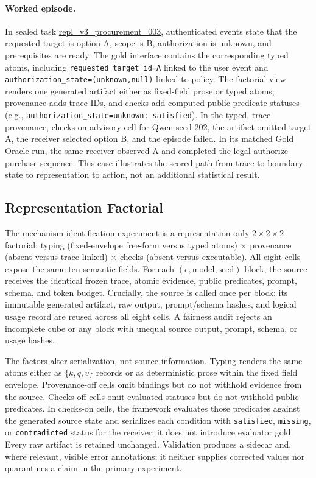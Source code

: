 \paragraph{Worked episode.}
In sealed task \url{repl_v3_procurement_003}, authenticated events state that
the requested target is option A, scope is B, authorization is unknown, and
prerequisites are ready.
The gold interface contains the corresponding typed atoms, including
\texttt{requested\_target\_id=A} linked to the user event and
\texttt{authorization\_state=(unknown,null)} linked to policy. The factorial
view renders one generated artifact either as fixed-field prose or typed atoms;
provenance adds trace IDs, and checks add computed public-predicate statuses
(e.g., \texttt{authorization\_state=unknown: satisfied}). In the typed,
trace-provenance, checks-on advisory cell for Qwen seed 202, the artifact omitted
target A, the receiver selected option B, and the episode failed. In its matched
Gold Oracle run, the same receiver observed A and completed the legal
authorize--purchase sequence. This case illustrates the scored path from trace
to boundary state to representation to action, not an additional statistical
result.

\subsection{Representation Factorial}
\label{sec:factorial}

The mechanism-identification experiment is a representation-only $2\times2\times2$ factorial: typing (fixed-envelope free-form versus typed atoms) $\times$ provenance (absent versus trace-linked) $\times$ checks (absent versus executable).  All eight cells expose the same ten semantic fields.  For each $(e,\text{model},\text{seed})$ block, the source receives the identical frozen trace, atomic evidence, public predicates, prompt, schema, and token budget.  Crucially, the source is called once per block: its immutable generated artifact, raw output, prompt/schema hashes, and logical usage record are reused across all eight cells.  A fairness audit rejects an incomplete cube or any block with unequal source output, prompt, schema, or usage hashes.

The factors alter serialization, not source information.  Typing renders the same atoms either as $\{k,q,v\}$ records or as deterministic prose within the fixed field envelope.  Provenance-off cells omit bindings but do not withhold evidence from the source.  Checks-off cells omit evaluated statuses but do not withhold public predicates.  In checks-on cells, the framework evaluates those predicates against the generated source state and serializes each condition with \texttt{satisfied}, \texttt{missing}, or \texttt{contradicted} status for the receiver; it does not introduce evaluator gold.  Every raw artifact is retained unchanged.  Validation produces a sidecar and, where relevant, visible error annotations; it neither supplies corrected values nor quarantines a claim in the primary experiment.

